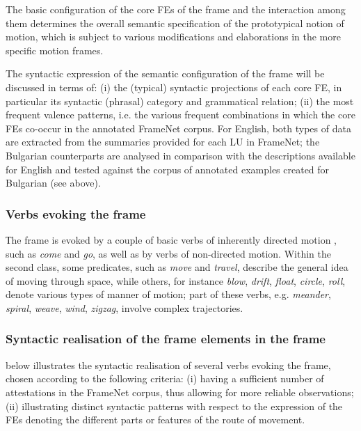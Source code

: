 \documentclass[output=paper,colorlinks,citecolor=brown]{langscibook}
\begin{document}
The basic configuration of the core FEs of the  frame and the interaction among them determines the overall semantic specification of the prototypical notion of motion, which is subject to various modifications and elaborations in the more specific motion frames.

The syntactic expression of the semantic configuration of the  frame will be discussed in terms of: (i) the (typical) syntactic projections of each core FE, in particular its syntactic (phrasal) category and grammatical relation; (ii) the most frequent valence patterns, i.e. the various frequent combinations in which the core FEs co-occur in the annotated FrameNet corpus. For English, both types of data are extracted from the summaries provided for each LU in FrameNet; the Bulgarian counterparts are analysed in comparison with the descriptions available for English and tested against the corpus of annotated examples created for Bulgarian (see  above).

\subsubsection{Verbs evoking the  frame}

Тhe  frame is evoked by a couple of basic verbs of inherently directed motion \citep{Levin1993}, such as \textit{come} and \textit{go}, as well as by verbs of non-directed motion. Within the second class, some predicates, such as \textit{move} and \textit{travel}, describe the general idea of moving through space, while others, for instance \textit{blow}, \textit{drift}, \textit{float}, \textit{circle}, \textit{roll}, denote various types of manner of motion; part of these verbs, e.g. \textit{meander}, \textit{spiral}, \textit{weave}, \textit{wind}, \textit{zigzag}, involve complex trajectories. 


\subsubsection{Syntactic realisation of the frame elements in the  frame}

 below illustrates the syntactic realisation of several verbs evoking the  frame, chosen according to the following criteria: (i) having a sufficient number of attestations in the FrameNet corpus, thus allowing for more reliable observations; (ii) illustrating distinct syntactic patterns with respect to the expression of the FEs denoting the different parts or features of the route of movement.
\end{document}
